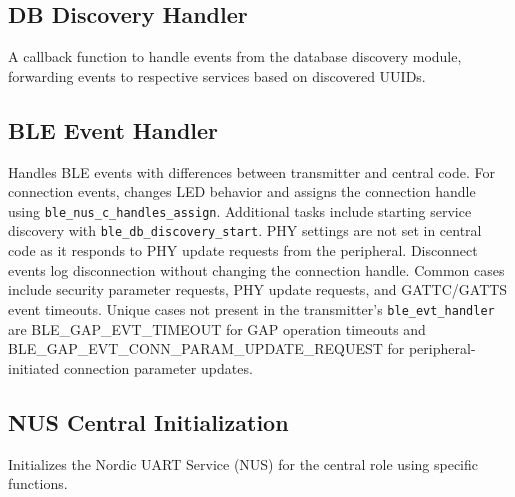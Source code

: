 \documentclass{Configuration_Files/PoliMi3i_thesis}
\begin{document}
\subsection*{DB Discovery Handler}
A callback function to handle events from the database discovery module, forwarding events to respective services based on discovered UUIDs.

\subsection*{BLE Event Handler}
Handles BLE events with differences between transmitter and central code. For connection events, changes LED behavior and assigns the connection handle using \texttt{ble\_nus\_c\_handles\_assign}. Additional tasks include starting service discovery with \texttt{ble\_db\_discovery\_start}. PHY settings are not set in central code as it responds to PHY update requests from the peripheral. Disconnect events log disconnection without changing the connection handle. Common cases include security parameter requests, PHY update requests, and GATTC/GATTS event timeouts. Unique cases not present in the transmitter's \texttt{ble\_evt\_handler} are BLE\_GAP\_EVT\_TIMEOUT for GAP operation timeouts and BLE\_GAP\_EVT\_CONN\_PARAM\_UPDATE\_REQUEST for peripheral-initiated connection parameter updates.

\subsection*{NUS Central Initialization}
Initializes the Nordic UART Service (NUS) for the central role using specific functions.
\end{document}
